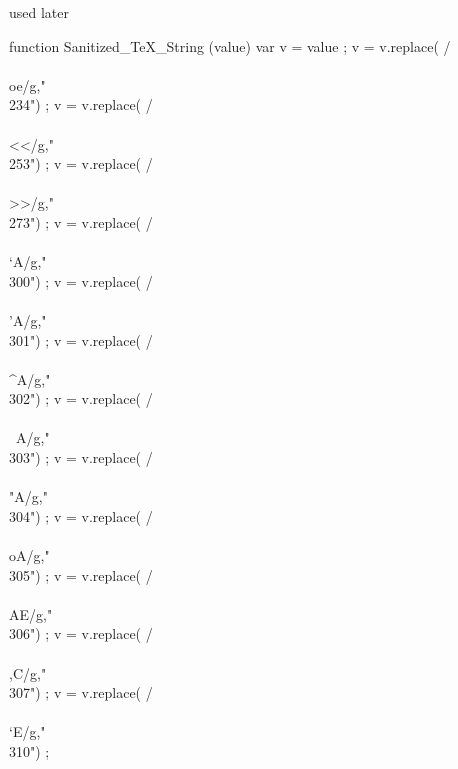 


 used later

  function Sanitized_TeX_String (value)
    { var v = value ;
      v = v.replace(  /\\\\oe/g,"\\234") ;
      v = v.replace(  /\\\\<</g,"\\253") ;
      v = v.replace(  /\\\\>>/g,"\\273") ;
      v = v.replace(  /\\\\`A/g,"\\300") ;
      v = v.replace(  /\\\\'A/g,"\\301") ;
      v = v.replace(  /\\\\^A/g,"\\302") ;
      v = v.replace(  /\\\\~A/g,"\\303") ;
      v = v.replace(  /\\\\"A/g,"\\304") ;
      v = v.replace(  /\\\\oA/g,"\\305") ;
      v = v.replace(  /\\\\AE/g,"\\306") ;
      v = v.replace(  /\\\\,C/g,"\\307") ;
      v = v.replace(  /\\\\`E/g,"\\310") ;
}

